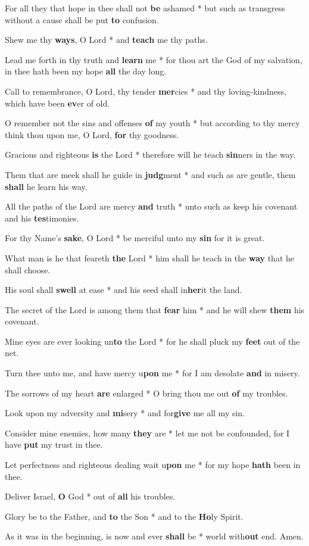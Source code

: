 \begin{multicols}{2}
	For all they that hope in thee shall not \textbf{be} ashamed * but such as transgress without a cause shall be put \textbf{to} confusion.
	
	Shew me thy \textbf{ways}, O Lord * and \textbf{teach} me thy paths.
	
	Lead me forth in thy truth and \textbf{learn} me * for thou art the God of my salvation, in thee hath been my hope \textbf{all} the day long.
	
	Call to remembrance, O Lord, thy tender \textbf{mer}cies * and thy loving-kindness, which have been \textbf{ev}er of old.
	
	O remember not the sins and offenses \textbf{of} my youth * but according to thy mercy think thou upon me, O Lord, \textbf{for} thy goodness.
	
	Gracious and righteous \textbf{is} the Lord * therefore will he teach \textbf{sin}ners in the way.
	
	Them that are meek shall he guide in \textbf{judg}ment * and such as are gentle, them \textbf{shall} he learn his way.
	
	All the paths of the Lord are mercy \textbf{and} truth * unto such as keep his covenant and his \textbf{tes}timonies.
	
	For thy Name's \textbf{sake}, O Lord * be merciful unto my \textbf{sin} for it is great.
	
	What man is he that feareth \textbf{the} Lord * him shall he teach in the \textbf{way} that he shall choose.
	
	His soul shall \textbf{swell} at ease * and his seed shall in\textbf{her}it the land.
	
	The secret of the Lord is among them that \textbf{fear} him * and he will shew \textbf{them} his covenant.
	
	Mine eyes are ever looking un\textbf{to} the Lord * for he shall pluck my \textbf{feet} out of the net.
	
	Turn thee unto me, and have mercy u\textbf{pon} me * for I am desolate \textbf{and} in misery.
	
	The sorrows of my heart \textbf{are} enlarged * O bring thou me out \textbf{of} my troubles.
	
	Look upon my adversity and \textbf{mi}sery * and for\textbf{give} me all my sin.
	
	Consider mine enemies, how many \textbf{they} are * let me not be confounded, for I have \textbf{put} my trust in thee.
	
	Let perfectness and righteous dealing wait u\textbf{pon} me * for my hope \textbf{hath} been in thee.
	
	Deliver Israel, \textbf{O} God * out of \textbf{all} his troubles.
	
	Glory be to the Father, and \textbf{to} the Son * and to the \textbf{Ho}ly Spirit.
	
	As it was in the beginning, is now and ever \textbf{shall} be * world with\textbf{out} end. Amen.
\end{multicols}